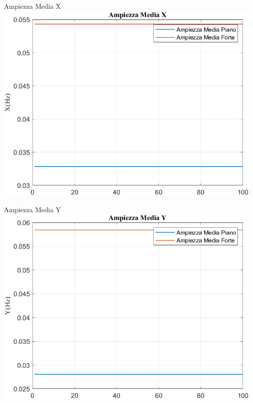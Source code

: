 	
	
	\begin{frame}{{Ampiezza Media X}}
		\centering\includegraphics[height=.8\textheight]{figure/Mag/Trasformata/Ampiezza MediaX}
	\end{frame}
	
	\begin{frame}{{Ampiezza Media Y}}
		\centering\includegraphics[height=.8\textheight]{figure/Mag/Trasformata/Ampiezza MediaY}
	\end{frame}
	
